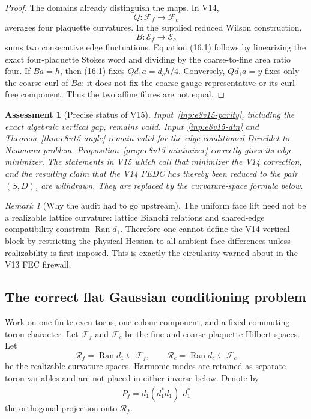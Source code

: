 \documentclass[11pt,oneside]{book}
\newtheorem{assessment}[theorem]{Assessment}
\theoremstyle{definition}
\theoremstyle{remark}
\newtheorem{remark}[theorem]{Remark}
\begin{document}
\begin{proof}
The domains already distinguish the maps.  In V14,
\[
 Q:\mathcal F_f\longrightarrow\mathcal F_c
\]
averages four plaquette curvatures.  In the supplied reduced Wilson
construction,
\[
 B:\mathcal E_f\longrightarrow\mathcal E_c
\]
sums two consecutive edge fluctuations.  Equation (16.1) follows by
linearizing the exact four-plaquette Stokes word and dividing by the
coarse-to-fine area ratio four.  If \(Ba=h\), then (16.1) fixes
\(Qd_1a=d_ch/4\).  Conversely, \(Qd_1a=y\) fixes only the coarse curl
of \(Ba\); it does not fix the coarse gauge representative or its
curl-free component.  Thus the two affine fibres are not equal.
\end{proof}

\begin{assessment}[Precise status of V15]
\label{ass:e8v16-v15-status}
Input~\ref{inp:e8v15-parity}, including the exact algebraic vertical
gap, remains valid.  Input~\ref{inp:e8v15-dtn} and
Theorem~\ref{thm:e8v15-angle} remain valid for the edge-conditioned
Dirichlet-to-Neumann problem.  Proposition~\ref{prop:e8v15-minimizer}
correctly gives its edge minimizer.  The statements in V15 which call
that minimizer the V14 correction, and the resulting claim that the
V14 FEDC has thereby been reduced to the pair \((S,D)\), are withdrawn.
They are replaced by the curvature-space formula below.
\end{assessment}

\begin{remark}[Why the audit had to go upstream]
\label{rem:e8v16-upstream}
The uniform face lift need not be a realizable lattice curvature:
lattice Bianchi relations and shared-edge compatibility constrain
\(\operatorname{Ran}d_1\).  Therefore one cannot define the V14
vertical block by restricting the physical Hessian to all ambient
face differences unless realizability is first imposed.  This is
exactly the circularity warned about in the V13 FEC firewall.
\end{remark}

\subsection{The correct flat Gaussian conditioning problem}

Work on one finite even torus, one colour component, and a fixed
commuting toron character.  Let \(\mathcal F_f\) and \(\mathcal F_c\)
be the fine and coarse plaquette Hilbert spaces.  Let
\[
 \mathcal R_f=\operatorname{Ran}d_1\subseteq\mathcal F_f,\qquad
 \mathcal R_c=\operatorname{Ran}d_c\subseteq\mathcal F_c              \tag{16.2}
\]
be the realizable curvature spaces.  Harmonic modes are retained as
separate toron variables and are not placed in either inverse below.
Denote by
\[
 P_f=d_1(d_1^*d_1)^\dagger d_1^*                                  \tag{16.3}
\]
the orthogonal projection onto \(\mathcal R_f\).
\end{document}
